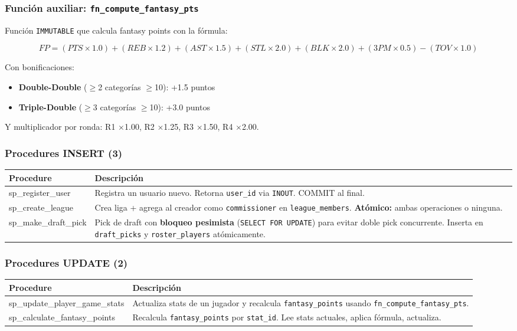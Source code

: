 \documentclass[12pt,a4paper]{article}
\begin{document}
\subsubsection{Funci\'on auxiliar: \texttt{fn\_compute\_fantasy\_pts}}

Funci\'on \texttt{IMMUTABLE} que calcula fantasy points con la f\'ormula:

$$FP = (PTS \times 1.0) + (REB \times 1.2) + (AST \times 1.5) + (STL \times 2.0) + (BLK \times 2.0) + (3PM \times 0.5) - (TOV \times 1.0)$$

Con bonificaciones:
\begin{itemize}[nosep]
    \item \textbf{Double-Double} ($\geq$2 categor\'ias $\geq$10): +1.5 puntos
    \item \textbf{Triple-Double} ($\geq$3 categor\'ias $\geq$10): +3.0 puntos
\end{itemize}

Y multiplicador por ronda: R1 $\times$1.00, R2 $\times$1.25, R3 $\times$1.50, R4 $\times$2.00.

\subsubsection{Procedures INSERT (3)}

\begin{longtable}{>{\ttfamily\small}p{4.5cm} p{9cm}}
\toprule
\normalfont\textbf{Procedure} & \textbf{Descripci\'on} \\
\midrule
sp\_register\_user & Registra un usuario nuevo. Retorna \texttt{user\_id} via \texttt{INOUT}. COMMIT al final. \\[4pt]
sp\_create\_league & Crea liga + agrega al creador como \texttt{commissioner} en \texttt{league\_members}. \textbf{At\'omico:} ambas operaciones o ninguna. \\[4pt]
sp\_make\_draft\_pick & Pick de draft con \textbf{bloqueo pesimista} (\texttt{SELECT FOR UPDATE}) para evitar doble pick concurrente. Inserta en \texttt{draft\_picks} y \texttt{roster\_players} at\'omicamente. \\
\bottomrule
\end{longtable}

\subsubsection{Procedures UPDATE (2)}

\begin{longtable}{>{\ttfamily\small}p{5.5cm} p{8cm}}
\toprule
\normalfont\textbf{Procedure} & \textbf{Descripci\'on} \\
\midrule
sp\_update\_player\_game\_stats & Actualiza stats de un jugador y recalcula \texttt{fantasy\_points} usando \texttt{fn\_compute\_fantasy\_pts}. \\[4pt]
sp\_calculate\_fantasy\_points & Recalcula \texttt{fantasy\_points} por \texttt{stat\_id}. Lee stats actuales, aplica f\'ormula, actualiza. \\
\bottomrule
\end{longtable}
\end{document}
